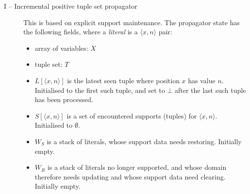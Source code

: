\documentclass[a4paper,11pt]{article}
\newcommand{\Extensional}{\Constraint{Extensional}~}
\newcommand{\FOREACH}[1]{\FORALL{{#1} \textbf{do}}}
\newcommand{\ENDFOREACH}{\ENDFOR}
\def\PROCEDURE{\item[\textbf{PROCEDURE}]}
\def\bool{\mathit{bool}}
\def\Extensional{\textsc{Extensional}}
\numberwithin{equation}{section}
\begin{document}
\begin{description}

  \item[I -- Incremental positive tuple set propagator]
    This is based on explicit support maintenance.  The propagator state
has the following fields, where a \emph{literal} is a $\langle x,n
\rangle$ pair:

\begin{itemize}
\item array of variables: $X$
\item tuple set: $T$
\item $L[\langle x,n \rangle]$ is the latest seen tuple where position
  $x$ has value $n$.  Initialised to the first such tuple, and set to
  $\bot$ after the last such tuple has been processed.
\item $S[\langle x,n \rangle]$ is a set of encountered supports
  (tuples) for $\langle x,n \rangle$.  Initialised to $\emptyset$.
\item $W_S$ is a stack of literals, whose support data needs restoring.
  Initially empty.
\item $W_R$ is a stack of literals no longer supported, and
  whose domain therefore needs updating and whose support data need clearing.
  Initially empty.
\end{itemize}


\end{description}
\end{document}
